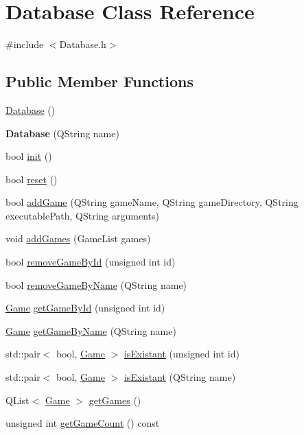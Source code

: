 \hypertarget{class_database}{}\section{Database Class Reference}
\label{class_database}


{\ttfamily \#include $<$Database.\+h$>$}

\subsection*{Public Member Functions}
\begin{DoxyCompactItemize}
\item 
\hyperlink{class_database_a4703c80e6969d33565ea340f768fdadf}{Database} ()
\item 
\hypertarget{class_database_ab9f6de56a252d6a2b637ad07908c706f}{}{\bfseries Database} (Q\+String name)\label{class_database_ab9f6de56a252d6a2b637ad07908c706f}

\item 
bool \hyperlink{class_database_a7c8d83dd74fe50ae3c261479235c702a}{init} ()
\item 
bool \hyperlink{class_database_aec44429a48d0b909cad5edee2539bccf}{reset} ()
\item 
bool \hyperlink{class_database_ade517bf453e5563aced153157a28ac02}{add\+Game} (Q\+String game\+Name, Q\+String game\+Directory, Q\+String executable\+Path, Q\+String arguments)
\item 
void \hyperlink{class_database_af780b78b83cf0c6e170e3ca21141acfc}{add\+Games} (Game\+List games)
\item 
bool \hyperlink{class_database_af01f04fa637918a199045a4d8e67ebe5}{remove\+Game\+By\+Id} (unsigned int id)
\item 
bool \hyperlink{class_database_a6523dbf229c96c88e13ef3945ad01f3b}{remove\+Game\+By\+Name} (Q\+String name)
\item 
\hyperlink{struct_game}{Game} \hyperlink{class_database_af4fd31e1db1e8611cb916c3dc1013099}{get\+Game\+By\+Id} (unsigned int id)
\item 
\hyperlink{struct_game}{Game} \hyperlink{class_database_ad8c60f1c8a4883a338d1d5183d40f90f}{get\+Game\+By\+Name} (Q\+String name)
\item 
std\+::pair$<$ bool, \hyperlink{struct_game}{Game} $>$ \hyperlink{class_database_a3a371b6396ecc4d6bb8b9e77c6257b51}{is\+Existant} (unsigned int id)
\item 
std\+::pair$<$ bool, \hyperlink{struct_game}{Game} $>$ \hyperlink{class_database_a7a0d78f1152ffe49cd711403c5306120}{is\+Existant} (Q\+String name)
\item 
Q\+List$<$ \hyperlink{struct_game}{Game} $>$ \hyperlink{class_database_a55b96f4463d01abb466546fa1058a44f}{get\+Games} ()
\item 
unsigned int \hyperlink{class_database_a7951029b2169460d090b7e6bad2ef030}{get\+Game\+Count} () const 
\end{DoxyCompactItemize}


